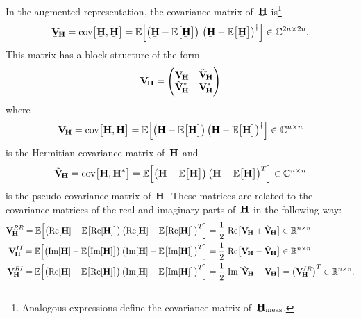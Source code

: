 In the augmented representation, the covariance matrix
of~$\underaccent{\bar}{\vect{H}}$ is\footnote{Analogous expressions
define the covariance matrix
of~$\underaccent{\bar}{\vect{H}}_\text{meas}$.}
\begin{equation}
  \underaccent{\bar}{\covMatSym}_{\!\vect{H}}
  = \cov[1]{\underaccent{\bar}{\vect{H}}, \underaccent{\bar}{\vect{H}}}
  = \exptVal[2]{\rBrk[1]{\underaccent{\bar}{\vect{H}} - \exptVal[1]{\underaccent{\bar}{\vect{H}}}}\,
  \rBrk[1]{\underaccent{\bar}{\vect{H}} - \exptVal[1]{\underaccent{\bar}{\vect{H}}}}^\dagger}
  \in \mathbb{C}^{2n \times 2n}.
\end{equation}
This matrix has a block structure of the form
\begin{equation}
  \label{eq:cov_augmented}
  \underaccent{\bar}{\covMatSym}_{\!\vect{H}}
  = \begin{pmatrix*}[l]
    \covMatSym_{\!\vect{H}} & \tilde{\covMatSym}_{\!\vect{H}} \\
    \tilde{\covMatSym}_{\!\vect{H}}^* & \covMatSym_{\!\vect{H}}^*
  \end{pmatrix*}
\end{equation}
where
\begin{equation}
  \covMatSym_{\!\vect{H}}
  = \cov[1]{\vect{H}, \vect{H}}
  = \exptVal[2]{\rBrk[1]{\vect{H} - \exptVal[1]{\vect{H}}} \rBrk[1]{\vect{H} - \exptVal[1]{\vect{H}}}^\dagger}
  \in \mathbb{C}^{n \times n}
\end{equation}
is the Hermitian covariance matrix of~$\bm{\mathrm{H}}$ and
\begin{equation}
  \tilde{\covMatSym}_{\!\vect{H}}
  = \cov[1]{\vect{H}, \vect{H}^*}
  = \exptVal[2]{\rBrk[1]{\vect{H} - \exptVal[1]{\vect{H}}} \rBrk[1]{\vect{H} - \exptVal[1]{\vect{H}}}^T}
  \in \mathbb{C}^{n \times n}
\end{equation}
is the pseudo-covariance matrix of~$\bm{\mathrm{H}}$.  These matrices are
related to the covariance matrices of the real and imaginary parts
of~$\bm{\mathrm{H}}$ in the following way:
\begin{align}
  \label{eq:cov_ReRe}
  \covMatSym_{\!\vect{H}}^{RR}
  = \exptVal[2]{\rBrk[1]{\Re{\vect{H}} - \exptVal[1]{\Re{\vect{H}}}} \rBrk[1]{\Re{\vect{H}} - \exptVal[1]{\Re{\vect{H}}}}^T}
  ={}& \frac{1}{2}\, \Re[1]{\covMatSym_{\!\vect{H}} + \tilde{\covMatSym}_{\!\vect{H}}}
  \in \mathbb{R}^{n \times n}
  \\
  \label{eq:cov_ImIm}
  \covMatSym_{\!\vect{H}}^{II}
  = \exptVal[2]{\rBrk[1]{\Im{\vect{H}} - \exptVal[1]{\Im{\vect{H}}}} \rBrk[1]{\Im{\vect{H}} - \exptVal[1]{\Im{\vect{H}}}}^T}
  ={}& \frac{1}{2}\, \Re[1]{\covMatSym_{\!\vect{H}} - \tilde{\covMatSym}_{\!\vect{H}}}
  \in \mathbb{R}^{n \times n}
  \\
  \label{eq:cov_ReIm}
  \covMatSym_{\!\vect{H}}^{RI}
  = \exptVal[2]{\rBrk[1]{\Re{\vect{H}} - \exptVal[1]{\Re{\vect{H}}}} \rBrk[1]{\Im{\vect{H}} - \exptVal[1]{\Im{\vect{H}}}}^T}
  ={}& \frac{1}{2}\, \Im[1]{\tilde{\covMatSym}_{\!\vect{H}} - \covMatSym_{\!\vect{H}}}
  = \rBrk[1]{\covMatSym_{\!\vect{H}}^{IR}}^T
  \in \mathbb{R}^{n \times n}.
\end{align}
